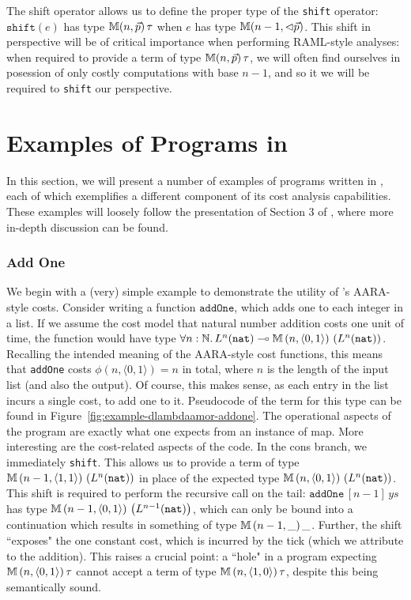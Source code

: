 The shift operator allows us to define the proper type of the \texttt{shift} operator: $\texttt{shift}(e)$ has type $\mathbb{M} (n,\vec{p}) \, \tau$ when $e$ has type $\mathbb{M} (n-1,\lhd\vec{p})$. This shift in perspective will be of critical importance when performing RAML-style analyses: when required to provide a term of type $\mathbb{M} (n,\vec{p}) \, \tau$, we will often find ourselves in posession of only costly computations with base $n-1$, and so it we will be required to \texttt{shift} our perspective.

\section{Examples of Programs in \dlambdaamor}
\label{sec:dlambdaamor-examples}
In this section, we will present a number of examples of programs written in \dlambdaamor, each of which exemplifies a different component of its cost analysis capabilities. These examples will loosely follow the presentation of Section 3 of \citet{rajani-et-al:popl21}, where more in-depth discussion can be found.

\subsubsection{Add One}
We begin with a (very) simple example to demonstrate the utility of \dlambdaamor's AARA-style costs. Consider writing a function $\texttt{addOne}$, which adds one to each integer in a list. If we assume the cost model that natural number addition costs one unit of time, the function would have type $\forall n : \mathbb{N}. \, L^n(\texttt{nat}) \multimap \mathbb{M} \, (n,\langle 0,1 \rangle) \, \left(L^n(\texttt{nat})\right)$. Recalling the intended meaning of the AARA-style cost functions, this means that \texttt{addOne} costs $\phi(n,\langle 0,1 \rangle) = n$ in total, where $n$ is the length of the input list (and also the output). Of course, this makes sense, as each entry in the list incurs a single cost, to add one to it. Pseudocode of the term for this type can be found in Figure~\ref{fig:example-dlambdaamor-addone}. The operational aspects of the program are exactly what one expects from an instance of map. More interesting are the cost-related aspects of the code. In the cons branch, we immediately \texttt{shift}. This allows us to provide a term of type  $\mathbb{M} \, (n-1,\langle 1,1 \rangle) \, \left(L^n(\texttt{nat})\right)$ in place of the expected type $\mathbb{M} \, (n,\langle 0,1 \rangle) \, \left(L^n(\texttt{nat})\right)$. This shift is required to perform the recursive call on the tail: $\texttt{addOne} \, [n-1] \, ys$ has type $\mathbb{M} \, (n-1,\langle 0,1 \rangle) \, \left(L^{n-1} (\texttt{nat})\right)$, which can only be bound into a continuation which results in something of type $\mathbb{M} \, (n-1, \_) \, \_$. Further, the shift ``exposes" the one constant cost, which is incurred by the tick (which we attribute to the addition). This raises a crucial point: a ``hole" in a program expecting $\mathbb{M} \, (n,\langle 0,1 \rangle) \, \tau$ cannot accept a term of type $\mathbb{M} \, (n, \langle 1,0 \rangle) \, \tau$, despite this being semantically sound.

